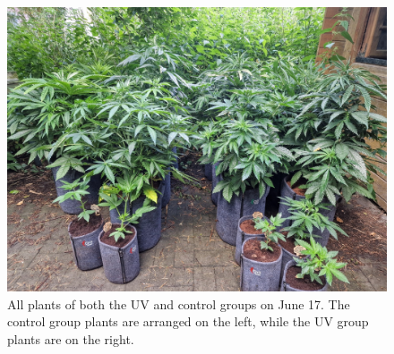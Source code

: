 \begin{figure}[htbp]
    \includegraphics[width=\linewidth]{plant_all_2024-06-17}
    \caption[Plants of both the UV and control groups on June 17]{All plants of both the UV and control groups on June 17. The control group plants are arranged on the left, while the UV group plants are on the right.}
    \label{fig:plant_all_2024-06-17}
\end{figure}